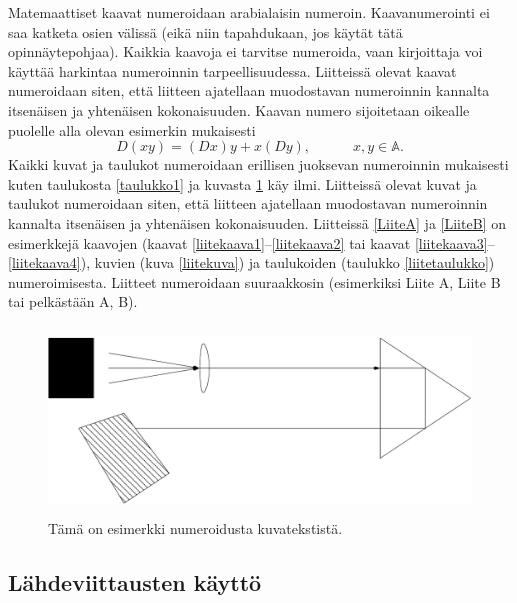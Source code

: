 \documentclass[english,12pt,a4paper,pdftex,elec,utf8]{aaltothesis}
\begin{document}
Matemaattiset kaavat numeroidaan arabialaisin
numeroin. Kaavanumerointi ei saa katketa osien v\"aliss\"a (eik\"a niin
tapahdukaan, jos k\"ayt\"at t\"at\"a opinn\"aytepohjaa). Kaikkia kaavoja ei tarvitse
numeroida, vaan kirjoittaja voi k\"aytt\"a\"a harkintaa numeroinnin
tarpeellisuudessa.  Liitteiss\"a olevat kaavat numeroidaan siten, ett\"a
liitteen ajatellaan muodostavan numeroinnin kannalta itsen\"aisen ja
yhten\"aisen kokonaisuuden. Kaavan numero sijoitetaan oikealle puolelle
alla olevan esimerkin mukaisesti
\begin{equation}
D(xy) = (Dx)y + x(Dy),  \hspace{3em} x,y \in \mathbb{A}.
\end{equation}
Kaikki kuvat ja taulukot numeroidaan erillisen juoksevan numeroinnin
mukaisesti kuten taulukosta \ref{taulukko1} ja kuvasta \ref{kuva1} k\"ay
ilmi.  Liitteiss\"a olevat kuvat ja taulukot numeroidaan siten, ett\"a
liitteen ajatellaan muodostavan numeroinnin kannalta itsen\"aisen ja
yhten\"aisen kokonaisuuden. Liitteiss\"a \ref{LiiteA} ja \ref{LiiteB} on
esimerkkej\"a kaavojen (kaavat \ref{liitekaava1}--\ref{liitekaava2} tai
kaavat \ref{liitekaava3}--\ref{liitekaava4}), kuvien (kuva
\ref{liitekuva}) ja taulukoiden (taulukko \ref{liitetaulukko})
numeroimisesta.  Liitteet numeroidaan suuraakkosin (esimerkiksi Liite
A, Liite B tai pelk\"ast\"a\"an A, B).
\begin{figure}[htb]
\centering \includegraphics[height=5cm]{kuva1}
\caption{T\"am\"a on esimerkki numeroidusta kuvatekstist\"a. \label{kuva1}}
\end{figure}

\subsection*{L\"ahdeviittausten k\"aytt\"o}
\end{document}
